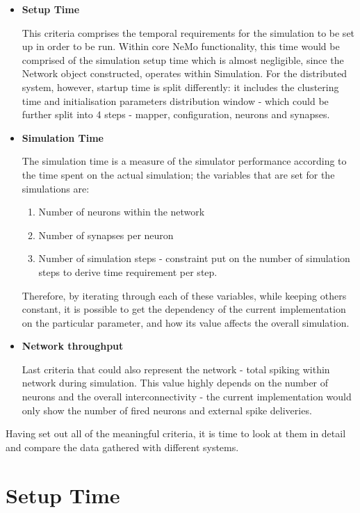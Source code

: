 \begin{itemize}
\item{\textbf{Setup Time}}

This criteria comprises the temporal requirements for the simulation to be set up in order to be run. Within core NeMo functionality, this time would be comprised of the simulation setup time which is almost negligible, since the Network object constructed, operates within Simulation. For the distributed system, however, startup time is split differently: it includes the clustering time and initialisation parameters distribution window - which could be further split into 4 steps - mapper, configuration, neurons and synapses.

\item{\textbf{Simulation Time}}

The simulation time is a measure of the simulator performance according to the time spent on the actual simulation; the variables that are set for the simulations are:

\begin{enumerate}	
	\item{Number of neurons} within the network
	\item{Number of synapses per neuron}
	\item{Number of simulation steps} - constraint put on the number of simulation steps to derive time requirement per step.
\end{enumerate}

Therefore, by iterating through each of these variables, while keeping others constant, it is possible to get the dependency of the current implementation on the particular parameter, and how its value affects the overall simulation.

\item{\textbf{Network throughput}}

Last criteria that could also represent the network - total spiking within network during simulation. This value highly depends on the number of neurons and the overall interconnectivity - the current implementation would only show the number of fired neurons and external spike deliveries.

\end{itemize}

Having set out all of the meaningful criteria, it is time to look at them in detail and compare the data gathered with different systems.

\section{Setup Time}

